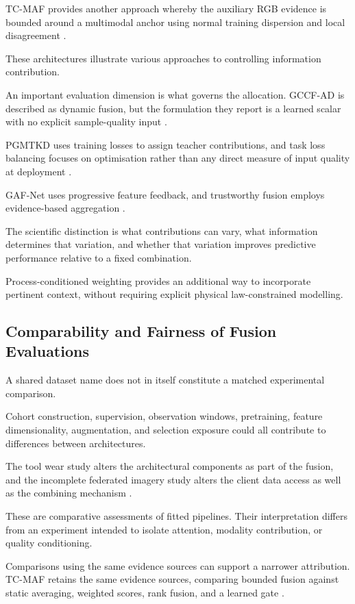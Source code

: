 TC-MAF provides another approach whereby the auxiliary RGB evidence is bounded around a multimodal
anchor using normal training dispersion and local disagreement \citep[PDF pp.~3--5]{P026}.

These architectures illustrate various approaches to controlling information contribution.

An important evaluation dimension is what governs the allocation. GCCF-AD is described as dynamic
fusion, but the formulation they report is a learned scalar with no explicit sample-quality input
\citep[PDF p.~3, Eq.~8]{P038}.

PGMTKD uses training losses to assign teacher contributions, and task loss balancing focuses on
optimisation rather than any direct measure of input quality at deployment
\citep{Li2025PGMTKD,P045}.

GAF-Net uses progressive feature feedback, and trustworthy fusion employs evidence-based aggregation
\citep{Huang2026Rolling,Ying2025Trustworthy}.

The scientific distinction is what contributions can vary, what information determines that
variation, and whether that variation improves predictive performance relative to a fixed
combination.

Process-conditioned weighting provides an additional way to incorporate pertinent context, without
requiring explicit physical law-constrained modelling.

\subsection{Comparability and Fairness of Fusion Evaluations}

A shared dataset name does not in itself constitute a matched experimental comparison.

Cohort construction, supervision, observation windows, pretraining, feature dimensionality,
augmentation, and selection exposure could all contribute to differences between architectures.

The tool wear study alters the architectural components as part of the fusion, and the incomplete
federated imagery study alters the client data access as well as the combining mechanism
\citep{P045,P051}.

These are comparative assessments of fitted pipelines. Their interpretation differs from an
experiment intended to isolate attention, modality contribution, or quality conditioning.

Comparisons using the same evidence sources can support a narrower attribution. TC-MAF retains the
same evidence sources, comparing bounded fusion against static averaging, weighted scores, rank
fusion, and a learned gate \citep[PDF p.~7, Table~3]{P026}.

